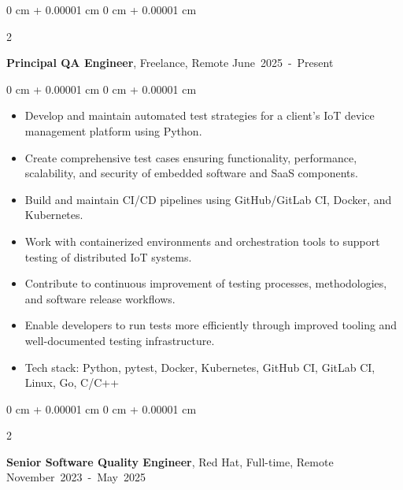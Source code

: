\documentclass[10pt, a4paper]{article}
\newenvironment{highlights}{
    \begin{itemize}[
        topsep=0.10 cm,
        parsep=0.10 cm,
        partopsep=0pt,
        itemsep=0pt,
        leftmargin=0 cm + 10pt
    ]
}{
    \end{itemize}
} %
\newenvironment{onecolentry}{
    \begin{adjustwidth}{
        0 cm + 0.00001 cm
    }{
        0 cm + 0.00001 cm
    }
}{
    \end{adjustwidth}
} %
\newenvironment{twocolentry}[2][]{
    \onecolentry
    \def\secondColumn{#2}
    \setcolumnwidth{\fill, 4.5 cm}
    \begin{paracol}{2}
}{
    \switchcolumn \raggedleft \secondColumn
    \end{paracol}
    \endonecolentry
} %
\begin{document}
        \begin{twocolentry}{
            \small\mbox{June 2025 - Present}
        }
            \textbf{Principal QA Engineer}, Freelance, Remote\end{twocolentry}

        \vspace{0.10 cm}
        \begin{onecolentry}
            \begin{highlights}
                \item Develop and maintain automated test strategies for a client's IoT device management platform using Python.
                \item Create comprehensive test cases ensuring functionality, performance, scalability, and security of embedded software and SaaS components.
                \item Build and maintain CI/CD pipelines using GitHub/GitLab CI, Docker, and Kubernetes.
                \item Work with containerized environments and orchestration tools to support testing of distributed IoT systems.
                \item Contribute to continuous improvement of testing processes, methodologies, and software release workflows.
                \item Enable developers to run tests more efficiently through improved tooling and well-documented testing infrastructure.
                \item Tech stack: Python, pytest, Docker, Kubernetes, GitHub CI, GitLab CI, Linux, Go, C/C++
            \end{highlights}
        \end{onecolentry}

        \vspace{0.5 cm}

        \begin{twocolentry}{
            \small\mbox{November 2023 - May 2025}
        }
            \textbf{Senior Software Quality Engineer}, Red Hat, Full-time, Remote\end{twocolentry}

        \vspace{0.10 cm}
\end{document}
